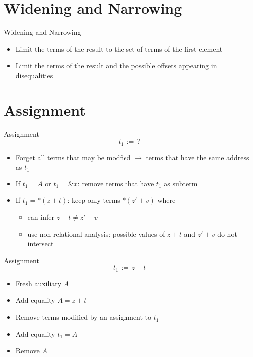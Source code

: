 \documentclass[aspectratio=169]{beamer}
\begin{document}
\section{Widening and Narrowing}
\begin{frame}{Widening and Narrowing}

    \begin{itemize}
        \item Limit the terms of the result to the set of terms of the first element
    \end{itemize}
    \begin{itemize}

        \item Limit the terms of the result and the possible offsets
              appearing in disequalities
    \end{itemize}

\end{frame}

\section{Assignment}

\begin{frame}{Assignment}
    \[
        t_1\,{:=}\,?
    \]
    \begin{itemize}
        \item Forget all terms that may be modfied $\rightarrow$ terms that have the same address as $t_1$
        \item If $t_1 = A$ or $t_1 = \&x$: remove terms that have $t_1$ as subterm
        \item If $t_1 = *(z + t)$: keep only terms $*(z' + v)$ where
              \begin{itemize}
                \item can infer $z + t \neq z' + v$ %
                  \item use non-relational analysis: possible values of $z + t$ and $z' + v$ do not intersect
              \end{itemize}
    \end{itemize}
\end{frame}

\begin{frame}{Assignment}
    \[
        t_1\,{:=}\,z + t
    \]
    \begin{itemize}
        \item Fresh auxiliary $A$
        \item Add equality $A = z + t$
        \item Remove terms modified by an assignment to $t_1$
        \item Add equality $t_1 = A$
        \item Remove $A$
    \end{itemize}
\end{frame}
\end{document}
